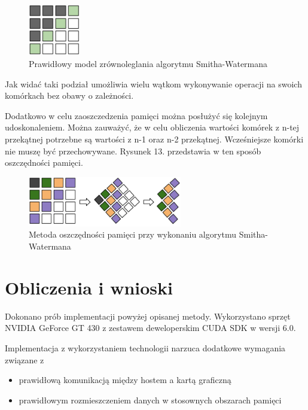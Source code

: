\documentclass[a4paper,12pt]{article}
\newenvironment{lista}{
\begin{itemize}
  \setlength{\itemsep}{1pt}
  \setlength{\parskip}{0pt}
  \setlength{\parsep}{0pt}
}{\end{itemize}}
\begin{document}
\begin{figure}[H]
  \vspace{5pt}
  \centering
  \begin{center}
  \includegraphics[width=0.2\textwidth]{images/DobryModelZrownoleglenia.png}
  \end{center}
  \caption{Prawidłowy model zrównoleglania algorytmu Smitha-Watermana}
 \end{figure}

Jak widać taki podział umożliwia wielu wątkom wykonywanie operacji na swoich komórkach bez obawy o zależności. 

Dodatkowo w celu zaoszczedzenia pamięci można posłużyć się kolejnym udoskonaleniem. Można zauważyć, że w celu obliczenia wartości komórek z n-tej przekątnej potrzebne są wartości z n-1 oraz n-2 przekątnej. Wcześniejsze komórki nie muszę być przechowywane. Rysunek 13. przedstawia w ten sposób oszczędności pamięci.

\begin{figure}[H]
  \vspace{5pt}
  \centering
  \begin{center}
  \includegraphics[width=0.6\textwidth]{images/OszczednoscPamieciPrzyZrownolegleniu.png}
  \end{center}
  \caption{Metoda oszczędności pamięci przy wykonaniu algorytmu Smitha-Watermana}
 \end{figure}


\section*{Obliczenia i wnioski}
Dokonano prób implementacji powyżej opisanej metody. Wykorzystano sprzęt NVIDIA GeForce GT 430 z zestawem deweloperskim CUDA SDK w wersji 6.0. 

Implementacja z wykorzystaniem technologii narzuca dodatkowe wymagania związane z
\begin{lista}
\item prawidłową komunikacją między hostem a kartą graficzną
\item prawidłowym rozmieszczeniem danych w stosownych obszarach pamięci
\end{lista} 
\end{document}
